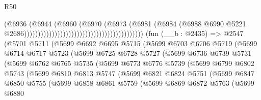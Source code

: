 \begin{lexlean}{R50}
\begin{coremodule}
                                                                          (@6936
                                                                            (@6944
                                                                              (@6960
                                                                                (@6970
                                                                                  (@6973
                                                                                    (@6981
                                                                                      (@6984
                                                                                        (@6988
                                                                                          @6990
                                                                                          @5221
                                                                                          @2686)))))))))))))))))))))))))))))))))))))))))))
    (fun (__b : @2435) =>
    @2547
      (@5701
        @5711
        (@5699
          @6692
          @6695
          @5715
          (@5699
            @6703
            @6706
            @5719
            (@5699
              @6714
              @6717
              @5723
              (@5699
                @6725
                @6728
                @5727
                (@5699
                  @6736
                  @6739
                  @5731
                  (@5699
                    @6762
                    @6765
                    @5735
                    (@5699
                      @6773
                      @6776
                      @5739
                      (@5699
                        @6799
                        @6802
                        @5743
                        (@5699
                          @6810
                          @6813
                          @5747
                          (@5699
                            @6821
                            @6824
                            @5751
                            (@5699
                              @6847
                              @6850
                              @5755
                              (@5699
                                @6858
                                @6861
                                @5759
                                (@5699
                                  @6869
                                  @6872
                                  @5763
                                  (@5699
                                    @6880

\end{coremodule}
\end{lexlean}
